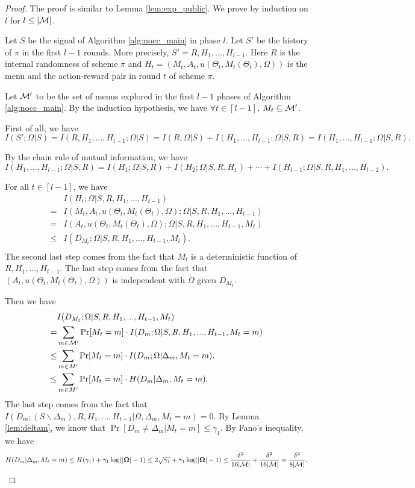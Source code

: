 \begin{proof}
The proof is similar to Lemma \ref{lem:exp_public}. We prove by induction on $l$ for $l \leq |\mathcal{M}|$. 


Let $S$ be the signal of Algorithm \ref{alg:nocc_main} in phase $l$. Let $S'$ be the history of $\pi$ in the first $l-1$ rounds. More precisely, $S' = R, H_1,...,H_{l-1}$. Here $R$ is the internal randomness of scheme $\pi$ and $H_t = (M_t, A_t,u(\Theta_t, M_t(\Theta_t), \Omega))$ is the menu and the action-reward pair in round $t$ of scheme $\pi$. 

Let $\mathcal{M}'$ to be the set of menus explored in the first $l-1$ phases of Algorithm \ref{alg:nocc_main}. By the induction hypothesis, we have $\forall t\in[l-1]$, $M_t \subseteq \mathcal{M}'$. 

First of all, we have
\[
I(S'; \Omega| S) = I(R,H_1,...,H_{l-1}; \Omega| S)  = I(R; \Omega| S) + I(H_1,...,H_{l-1}; \Omega|S, R) = I(H_1,...,H_{l-1}; \Omega|S, R). 
\]

By the chain rule of mutual information, we have
\[
 I(H_1,...,H_{l-1}; \Omega|S, R) = I(H_1;\Omega|S,R) + I(H_2;\Omega|S, R ,H_1) + \cdots + I(H_{l-1}; \Omega|S,R,H_1,...,H_{l-2}). 
\]

For all $t \in [l-1]$, we have
\begin{align*}
&I(H_t; \Omega|S,R,H_1,...,H_{t-1}) \\
=& I(M_t,A_t, u(\Theta_t, M_t(\Theta_t), \Omega); \Omega|S,R,H_1,...,H_{t-1}) \\
=& I(A_t, u(\Theta_t, M_t(\Theta_t), \Omega); \Omega | S,R,H_1,...,H_{t-1}, M_t)\\
\leq& I(D_{M_t}; \Omega|S,R,H_1,...,H_{t-1},M_t). \\
\end{align*}
The second last step comes from the fact that $M_t$ is a deterministic function of $R,H_1,...,H_{t-1}$. The last step comes from the fact that $(A_t,u(\Theta_t, M_t(\Theta_t), \Omega))$ is independent with $\Omega$ given $D_{M_t}$.

Then we have
\begin{align*}
& I(D_{M_t}; \Omega|S,R,H_1,...,H_{t-1},M_t)\\
=& \sum_{m \in \mathcal{M}'} \Pr[M_t = m] \cdot I(D_m;\Omega | S,R,H_1,...,H_{t-1},M_t = m)\\
\leq& \sum_{m \in M'} \Pr[M_t = m] \cdot I(D_m;\Omega| \Delta_m, M_t =m).\\
\leq& \sum_{m \in M'} \Pr[M_t = m] \cdot H(D_m| \Delta_m, M_t =m).
\end{align*}
The last step comes from the fact that $I(D_m; (S\backslash \Delta_m),R,H_1,...,H_{t-1}|\Omega, \Delta_m, M_t =m) = 0$. By Lemma \ref{lem:deltam}, we know that $\Pr[D_m \neq \Delta_m|M_t = m] \leq \gamma_1$. By Fano's inequality, we have
\[
H(D_m| \Delta_m, M_t =m) \leq H(\gamma_1) + \gamma_1 \log(|\bold{\Omega}| - 1) \leq 2\sqrt{\gamma_1} + \gamma_1 \log(|\bold{\Omega}| - 1)\leq \frac{\delta^2}{16|\mathcal{M}|}+\frac{\delta^2}{16|\mathcal{M}|}  = \frac{\delta^2}{8|\mathcal{M}|}. 
\]


\end{proof}
